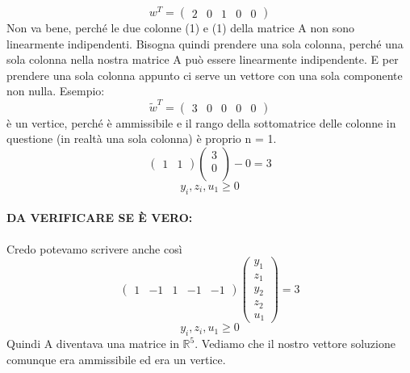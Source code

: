 \begin{equation*}
    w^T = \begin{pmatrix}
        2 & 0 & 1 & 0 & 0
    \end{pmatrix}
\end{equation*}
Non va bene, perché le due colonne (1) e (1) della matrice A non sono linearmente indipendenti. Bisogna quindi prendere una sola colonna, perché una sola colonna nella nostra matrice A può essere linearmente indipendente. E per prendere una sola colonna appunto ci serve un vettore con una sola componente non nulla. Esempio:
\begin{equation*}
    \tilde{w}^T = \begin{pmatrix}
        3 & 0 & 0 & 0 & 0
    \end{pmatrix}
\end{equation*}
è un vertice, perché è ammissibile e il rango della sottomatrice delle colonne in questione (in realtà una sola colonna) è proprio n = 1. 
\begin{equation*}
    \begin{pmatrix}
        1 & 1
    \end{pmatrix}\begin{pmatrix}
        3\\
        0\\
    \end{pmatrix} - 0 = 3
\end{equation*}
\begin{equation*}
    y_i,z_i,u_1 \geq 0
\end{equation*}


\paragraph{DA VERIFICARE SE È VERO:}
Credo potevamo scrivere anche così 
\begin{equation*}
    \begin{pmatrix}
        1 & -1 & 1 & -1 & -1
    \end{pmatrix}\begin{pmatrix}
        y_1\\
        z_1\\
        y_2\\
        z_2\\
        u_1
    \end{pmatrix} = 3
\end{equation*}
\begin{equation*}
    y_i,z_i,u_1 \geq 0
\end{equation*}
Quindi A diventava una matrice in $\mathbb{R}^5$. Vediamo che il nostro vettore soluzione comunque era ammissibile ed era un vertice.





